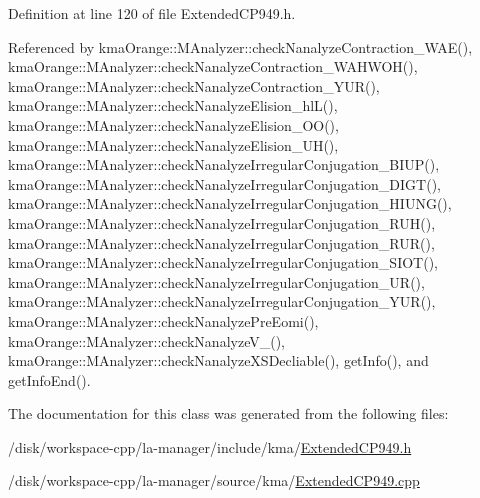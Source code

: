 Definition at line 120 of file ExtendedCP949.h.

Referenced by kmaOrange::MAnalyzer::checkNanalyzeContraction\_\-WAE(), kmaOrange::MAnalyzer::checkNanalyzeContraction\_\-WAHWOH(), kmaOrange::MAnalyzer::checkNanalyzeContraction\_\-YUR(), kmaOrange::MAnalyzer::checkNanalyzeElision\_\-hlL(), kmaOrange::MAnalyzer::checkNanalyzeElision\_\-OO(), kmaOrange::MAnalyzer::checkNanalyzeElision\_\-UH(), kmaOrange::MAnalyzer::checkNanalyzeIrregularConjugation\_\-BIUP(), kmaOrange::MAnalyzer::checkNanalyzeIrregularConjugation\_\-DIGT(), kmaOrange::MAnalyzer::checkNanalyzeIrregularConjugation\_\-HIUNG(), kmaOrange::MAnalyzer::checkNanalyzeIrregularConjugation\_\-RUH(), kmaOrange::MAnalyzer::checkNanalyzeIrregularConjugation\_\-RUR(), kmaOrange::MAnalyzer::checkNanalyzeIrregularConjugation\_\-SIOT(), kmaOrange::MAnalyzer::checkNanalyzeIrregularConjugation\_\-UR(), kmaOrange::MAnalyzer::checkNanalyzeIrregularConjugation\_\-YUR(), kmaOrange::MAnalyzer::checkNanalyzePreEomi(), kmaOrange::MAnalyzer::checkNanalyzeV\_\-(), kmaOrange::MAnalyzer::checkNanalyzeXSDecliable(), getInfo(), and getInfoEnd().

The documentation for this class was generated from the following files:\begin{CompactItemize}
\item 
/disk/workspace-cpp/la-manager/include/kma/\hyperlink{ExtendedCP949_8h}{ExtendedCP949.h}\item 
/disk/workspace-cpp/la-manager/source/kma/\hyperlink{ExtendedCP949_8cpp}{ExtendedCP949.cpp}\end{CompactItemize}
